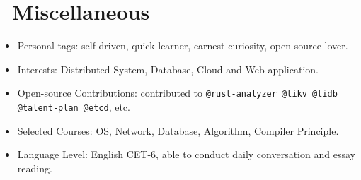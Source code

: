 \documentclass{resume}
\newcommand{\en}[1]{#1}
\newcommand{\zh}[1]{}
\begin{document}
\section{\faInfo\ \en{Miscellaneous}\zh{杂项}}
\begin{itemize}[parsep=0.25ex]
      \item \en{Personal tags: self-driven, quick learner, earnest curiosity, open source lover.}
            \zh{个人标签：自驱动，学习能力强，做事认真，保持好奇，热爱开源}
      \item \en{Interests: Distributed System, Database, Cloud and Web application.}
            \zh{兴趣领域：分布式系统、数据库、云以及 Web 应用等}
      \item \en{Open-source Contributions: contributed to \texttt{@rust-analyzer @tikv @tidb @talent-plan @etcd}, etc.}
            \zh{开源贡献: 为 \texttt{@rust-analyzer @tikv @tidb @talent-plan @etcd} 等项目组织贡献过代码}
      \item \en{Selected Courses: OS, Network, Database, Algorithm, Compiler Principle.}
            \zh{主修课程：操作系统、计算机网络、数据库系统原理、算法设计与分析、编译原理}
      \item \en{Language Level: English CET-6, able to conduct daily conversation and essay reading.}
            \zh{语言水平：英语 CET-6，能够进行日常对话和论文阅读}
\end{itemize}
\end{document}
